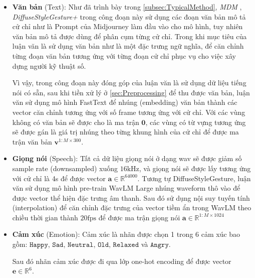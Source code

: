 \begin{itemize}
	\item \textbf{Văn bản} (Text):
		Như đã trình bày trong \autoref{subsec:TypicalMethod}, \textit{MDM} \cite{tevet2022human}, \textit{DiffuseStyleGesture+} \cite{yang2022DiffuseStyleGestureplus} trong công đoạn này sử dụng các đoạn văn bản mô tả cử chỉ như là Prompt của Midjourney làm đầu vào cho mô hình, tuy nhiên văn bản mô tả được dùng để phân cụm từng cử chỉ. Trong khi mục tiêu của luận văn là sử dụng văn bản như là một đặc trưng ngữ nghĩa, để căn chỉnh từng đoạn văn bản tương ứng với  từng đoạn cử chỉ phục vụ cho việc xây dựng người kỹ thuật số.
		
		Vì vậy, trong công đoạn này đóng góp của luận văn là sử dụng dữ liệu tiếng nói có sẵn, sau khi tiền xử lý ở \autoref{sec:Preprocessing} để thu được văn bản,  luận văn sử dụng mô hình FastText  \cite{bojanowski2017enriching} để nhúng (embedding) văn bản thành các vector căn chỉnh tương ứng với số frame tương ứng với cử chỉ. Với các vùng không có văn bản sẽ được cho là ma trận $\mathbf{0}$, các vùng có từ vựng tương ứng sẽ được gán là giá trị nhúng  theo từng khung hình của cử chỉ để được ma trận văn bản $\mathbf{v}^{1:M \times 300}$.
		
		\item \textbf{Giọng nói} (Speech): Tất cả dữ liệu giọng nói ở dạng wav sẽ được giảm số sample rate (downsampled) xuống $16 \mathrm{kHz}$, và giọng nói sẽ được lấy tương ứng với cử chỉ là 4s để được vector $\mathbf{a} \in \mathbb{R}^{64000}$. Tương tự DiffuseStyleGesture, luận văn sử dụng mô hình pre-train WavLM Large \cite{Chen_2022} nhúng waveform thô vào để được vector thể hiện đặc trưng âm thanh. Sau đó sử dụng nội suy tuyến tính (interpolation) để căn chỉnh đặc trưng của vector tiềm ẩn trong WavLM theo chiều thời gian thành $20 \text{fps}$ để được ma trận giọng nói $\mathbf{a} \in \mathbb{R}^{1:M \times 1024}$
		
		\item \textbf{Cảm xúc} (Emotion): Cảm xúc là nhãn được chọn 1 trong 6 cảm xúc bao gồm: $\texttt{Happy}$, $\texttt{Sad}$, $\texttt{Neutral}$, $\texttt{Old}$, $\texttt{Relaxed}$ và $\texttt{Angry}$. 
		
		Sau đó nhãn cảm xúc được đi qua lớp one-hot encoding để được vector  $\mathbf{e} \in \mathbb{R}^{6}$.
		
		
		

\end{itemize}
